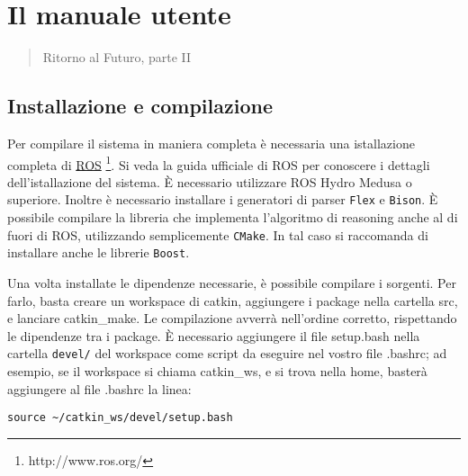 \chapter{Il manuale utente}
\label{app:manuale}
\thispagestyle{empty}

\begin{quotation}
{\footnotesize
{}
\begin{flushright}
Ritorno al Futuro, parte II
\end{flushright}
}
\end{quotation}
\vspace{0.5cm}

\section{Installazione e compilazione}

Per compilare il sistema in maniera completa è necessaria una istallazione completa di \href{http://www.ros.org/}{ROS} \footnote{http://www.ros.org/}. Si veda la guida ufficiale di ROS per conoscere i dettagli dell'istallazione del sistema. \`E necessario utilizzare ROS Hydro Medusa o superiore.
Inoltre è necessario installare i generatori di parser \verb|Flex| e \verb|Bison|.
\`E possibile compilare la libreria che implementa l'algoritmo di reasoning anche al di fuori di ROS, utilizzando semplicemente \verb|CMake|. In tal caso si raccomanda di installare anche le librerie \verb|Boost|.

Una volta installate le dipendenze necessarie, è possibile compilare i sorgenti. Per farlo, basta creare un workspace di catkin, aggiungere i package nella cartella src, e lanciare catkin\_make. Le compilazione avverrà nell'ordine corretto, rispettando le dipendenze tra i package.
\`E necessario aggiungere il file setup.bash nella cartella \verb|devel/| del workspace come script da eseguire nel vostro file .bashrc; ad esempio, se il workspace  si chiama catkin\_ws, e si trova nella home, basterà aggiungere al file .bashrc la linea:
\begin{verbatim}
source ~/catkin_ws/devel/setup.bash
\end{verbatim}

